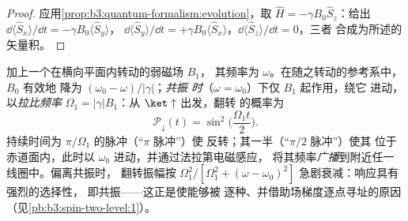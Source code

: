 \begin{proof}
应用\cref{prop:b3:quantum-formalism:evolution}，取 $\hat H =
-\gamma B_0\hat S_z$：给出 $\dd\langle\hat
S_x\rangle/\dd t = -\gamma B_0\langle\hat S_y\rangle$，
$\dd\langle\hat S_y\rangle/\dd t = +\gamma B_0\langle\hat
S_x\rangle$，$\dd\langle\hat S_z\rangle/\dd t = 0$，三者
合成为所述的矢量积。
\end{proof}

\begin{proposition}[磁共振]\label{prop:b3:spin-two-level:rabi}
加上一个在横向平面内转动的弱磁场 $B_1$，
其频率为 $\omega$。在随之转动的参考系中，$B_0$ 有效地
降为 $(\omega_0 - \omega)/|\gamma|$；\emph{共振
时}（$\omega = \omega_0$）下仅 $B_1$ 起作用，绕它
进动，以\emph{拉比频率} $\Omega_1 =
|\gamma|B_1$：从 $\ket\uparrow$ 出发，翻转
的概率为
\[
\mathcal P_\downarrow(t) = \sin^2\Big(\frac{\Omega_1t}{2}\Big) .
\]
持续时间为 $\pi/\Omega_1$ 的脉冲（“$\pi$ 脉冲”）使
反转；其一半（“$\pi/2$ 脉冲”）使其
位于赤道面内，此时以 $\omega_0$ 进动，并通过法拉第电磁感应，
将其频率\emph{广播}到附近任一线圈中。偏离共振时，
翻转振幅按 $\Omega_1^2/[\Omega_1^2 +
(\omega - \omega_0)^2]$ 急剧衰减：响应具有强烈的选择性，
即共振——这正是使能够被
逐种、并借助场梯度逐点寻址的原因
（见\cref{pb:b3:spin-two-level:1}）。
\end{proposition}
\admitted

